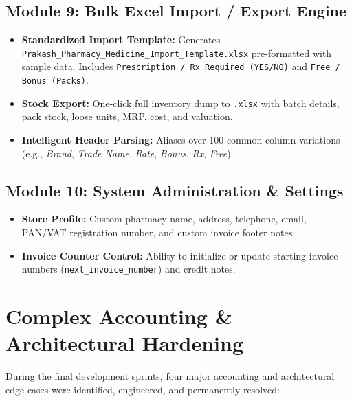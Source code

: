 \documentclass[10pt,a4paper]{article}
\begin{document}
\subsection{Module 9: Bulk Excel Import / Export Engine}
\begin{itemize}
    \item \textbf{Standardized Import Template:} Generates \texttt{Prakash\_Pharmacy\_Medicine\_Import\_Template.xlsx} pre-formatted with sample data. Includes \texttt{Prescription / Rx Required (YES/NO)} and \texttt{Free / Bonus (Packs)}.
    \item \textbf{Stock Export:} One-click full inventory dump to \texttt{.xlsx} with batch details, pack stock, loose units, MRP, cost, and valuation.
    \item \textbf{Intelligent Header Parsing:} Aliases over 100 common column variations (e.g., \textit{Brand}, \textit{Trade Name}, \textit{Rate}, \textit{Bonus}, \textit{Rx}, \textit{Free}).
\end{itemize}

\subsection{Module 10: System Administration \& Settings}
\begin{itemize}
    \item \textbf{Store Profile:} Custom pharmacy name, address, telephone, email, PAN/VAT registration number, and custom invoice footer notes.
    \item \textbf{Invoice Counter Control:} Ability to initialize or update starting invoice numbers (\texttt{next\_invoice\_number}) and credit notes.
\end{itemize}

\newpage

\section{Complex Accounting \& Architectural Hardening}

During the final development sprints, four major accounting and architectural edge cases were identified, engineered, and permanently resolved:
\end{document}
